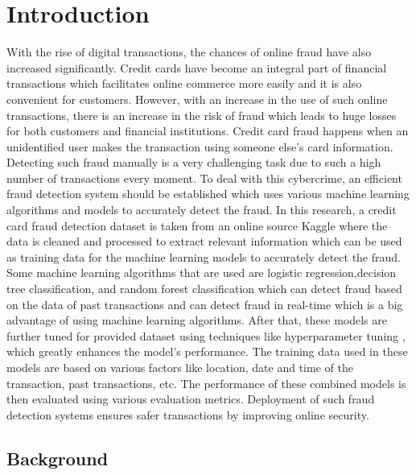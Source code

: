 \chapter{Introduction}
\label{ch:into} %

With the rise of digital transactions, the chances of online fraud have also increased 
significantly. Credit cards have become an integral part of financial transactions which facilitates online commerce more easily and it is also convenient for customers. However, with an increase in the use of such online transactions, there is an increase in the risk of fraud which leads to huge losses for both customers and financial institutions. Credit card fraud happens when an unidentified user makes the transaction using someone else’s card information.
Detecting such fraud manually is a very challenging task due to such a high number of transactions every moment. To deal with this cybercrime, an efficient fraud detection system \citep{Dornadula-2019} should be established which uses various machine learning algorithms and models to accurately detect the fraud. In this research, a credit card fraud detection dataset  is taken from an online source Kaggle \citep{Kaggle}  where the data is cleaned and processed to extract relevant information which can be used as training data for the machine learning models to accurately detect the fraud. Some machine learning algorithms \citep{Shah-2023} that are used are logistic regression,decision tree classification, and random forest classification which can detect fraud based on the data of past transactions and can detect fraud in real-time which is a big advantage of using machine learning algorithms. After that, these models are further tuned for provided dataset  using techniques like hyperparameter tuning \citep{Dalal-2022} , which greatly enhances the model's performance. The training data used in these models are based on various factors like location, date and time of the transaction, past transactions, etc. The performance of these combined models is then evaluated using various evaluation metrics. Deployment of such fraud detection systems ensures safer transactions by improving online security.




\section{Background}
\label{sec:into_back}

